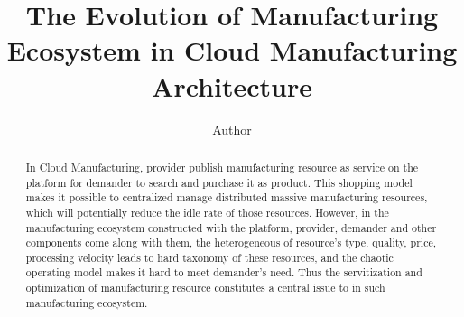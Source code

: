 
\title{The Evolution of Manufacturing Ecosystem in Cloud Manufacturing Architecture
}

\author[label1]{Author}
\address[label1]{ZJU}
\begin{abstract}
In Cloud Manufacturing, provider publish manufacturing resource as service on the platform for demander to search and purchase it as product. This shopping model makes it possible to centralized manage distributed massive manufacturing resources, which will potentially reduce the idle rate of those resources. 
However, in the manufacturing ecosystem constructed with the platform, provider, demander and other components come along with them, the heterogeneous of resource's type, quality, price, processing velocity leads to hard taxonomy of these resources, and the chaotic operating model makes it hard to meet demander's need.
Thus the servitization and optimization of manufacturing resource constitutes a central issue to  in such manufacturing ecosystem.












\end{abstract}
